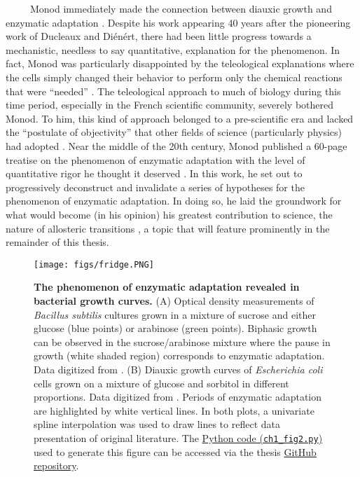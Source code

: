 \documentclass[12pt]{caltech_thesis}
\begin{document}
~~~~~Monod immediately made the connection between diauxic growth and
enzymatic adaptation \autocite{loison2013}. Despite his work appearing
40 years after the pioneering work of Ducleaux and Diénért, there had
been little progress towards a mechanistic, needless to say
quantitative, explanation for the phenomenon. In fact, Monod was
particularly disappointed by the teleological explanations where the
cells simply changed their behavior to perform only the chemical
reactions that were ``needed'' \autocite{loison2013}. The teleological
approach to much of biology during this time period, especially in the
French scientific community, severely bothered Monod. To him, this kind
of approach belonged to a pre-scientific era and lacked the ``postulate
of objectivity'' that other fields of science (particularly physics) had
adopted \autocite{loison2013}. Near the middle of the 20th century,
Monod published a 60-page treatise on the phenomenon of enzymatic
adaptation with the level of quantitative rigor he thought it deserved
\autocite{monod1947}. In this work, he set out to progressively
deconstruct and invalidate a series of hypotheses for the phenomenon of
enzymatic adaptation. In doing so, he laid the groundwork for what would
become (in his opinion) his greatest contribution to science, the nature
of allosteric transitions \autocite{loison2013,monod1963,monod1965}, a
topic that will feature prominently in the remainder of this thesis.

\hypertarget{fig:diauxie_fig}{%
\begin{figure}
\centering
\texttt{[image: figs/fridge.PNG]}
\caption[{The phenomenon of enzymatic adaptation revealed in bacterial
growth curves.}]{\textbf{The phenomenon of enzymatic adaptation revealed
in bacterial growth curves.} (A) Optical density measurements of
\emph{Bacillus subtilis} cultures grown in a mixture of sucrose and
either glucose (blue points) or arabinose (green points). Biphasic
growth can be observed in the sucrose/arabinose mixture where the pause
in growth (white shaded region) corresponds to enzymatic adaptation.
Data digitized from \textcite{monod1941}. (B) Diauxic growth curves of
\emph{Escherichia coli} cells grown on a mixture of glucose and sorbitol
in different proportions. Data digitized from \textcite{monod1947}.
Periods of enzymatic adaptation are highlighted by white vertical lines.
In both plots, a univariate spline interpolation was used to draw lines
to reflect data presentation of original literature. The
\href{https://github.com/gchure/phd/blob/master/src/chapter_01/code/ch1_fig2.py}{Python
code (\texttt{ch1\_fig2.py})} used to generate this figure can be
accessed via the thesis \href{https://github.com/gchure/phd}{GitHub
repository}.}
\label{fig:diauxie_fig}
\end{figure}
}
\end{document}
